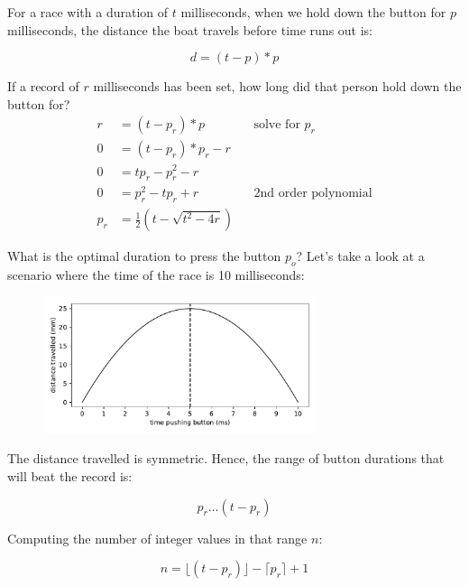 \documentclass[a4paper, 11pt]{article}
\begin{document}
For a race with a duration of $t$ milliseconds, when we hold down the button for $p$ milliseconds, the distance the boat travels before time runs out is:

\begin{equation*}
    d = (t - p) * p
\end{equation*}

If a record of $r$ milliseconds has been set, how long did that person hold down the button for?
\begin{align*}
    r &= (t - p_r) * p &&\text{solve for $p_r$} \\
    0 &= (t - p_r) * p_r - r \\
    0 &= tp_r - p_r^2 - r \\
    0 &= p_r^2 - tp_r + r &&\text{2nd order polynomial} \\
    p_r &= \frac{1}{2} (t - \sqrt{t^2 - 4r})
\end{align*}

What is the optimal duration to press the button $p_o$? Let's take a look at a scenario where the time of the race is 10 milliseconds:

\begin{figure}[h!]
    \centering
    \includegraphics[width=8cm]{fig1.pdf}
\end{figure}

The distance travelled is symmetric.
Hence, the range of button durations that will beat the record is:

\begin{equation*}
    p_r \ldots (t - p_r)
\end{equation*}

Computing the number of integer values in that range $n$:

\begin{equation*}
    n = \lfloor (t - p_r) \rfloor - \lceil p_r \rceil + 1
\end{equation*}
\end{document}
